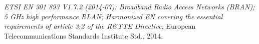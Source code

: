 %

\begin{thebibliography}{99.}%
\emph{ETSI EN 301 893 V1.7.2 (2014-07): Broadband Radio Access Networks (BRAN); 5 GHz high performance RLAN; Harmonized EN covering the essential requirements of article 3.2 of the R\&TTE Directive}, European Telecommunications Standards Institute Std., 2014.
\end{thebibliography}
